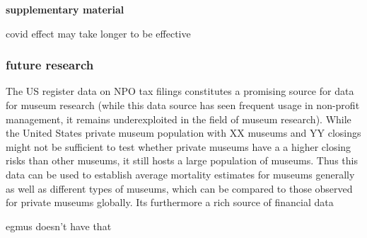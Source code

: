 \documentclass[12pt]{article}
\begin{document}
\textbf{supplementary material}






covid effect may take longer to be effective
\subsubsection*{future research}

The US register data on NPO tax filings constitutes a promising source for data for museum research (while this data source has seen frequent usage in non-profit management, it remains underexploited in the field of museum research). 
While the United States private museum population with XX museums and YY closings might not be sufficient to test whether private museums have a a higher closing risks than other museums, it still hosts a large population of museums.
Thus this data can be used to establish average mortality estimates for museums generally as well as different types of museums, which can be compared to those observed for private museums globally. 
Its furthermore a rich source of financial data

egmus doesn't have that
\end{document}
